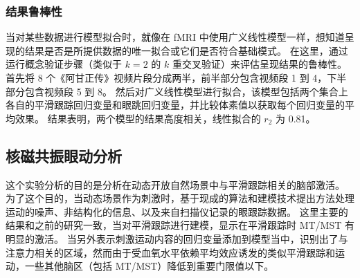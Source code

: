 



\subsubsection{结果鲁棒性} \label{sec:result_robustness}
当对某些数据进行模型拟合时，就像在 fMRI 中使用广义线性模型一样，想知道呈现的结果是否是所提供数据的唯一拟合或它们是否符合基础模式。
在这里，通过运行概念验证步骤（类似于 $k = 2$ 的 $k$ 重交叉验证）来评估呈现结果的鲁棒性。
首先将 8 个《阿甘正传》视频片段分成两半，前半部分包含视频段 1 到 4，下半部分包含视频段 5 到 8。
然后对广义线性模型进行拟合，该模型包括两个集合上各自的平滑跟踪回归变量和眼跳回归变量，并比较体素值以获取每个回归变量的平均效果。 
结果表明，两个模型的结果高度相关，线性拟合的 $r_2$ 为 0.81。




\subsection{核磁共振眼动分析}
这个实验分析的目的是分析在动态开放自然场景中与平滑跟踪相关的脑部激活。
为了这个目的，当动态场景作为刺激时，基于现成的算法和建模技术提出方法处理运动的噪声、非结构化的信息、以及来自扫描仪记录的眼跟踪数据。
这里主要的结果和之前的研究一致，当对平滑跟踪进行建模，显示在平滑跟踪时 MT/MST 有明显的激活。
当另外表示刺激运动内容的回归变量添加到模型当中，识别出了与注意力相关的区域，然而由于受血氧水平依赖平均效应诱发的类似平滑跟踪和运动，一些其他脑区（包括 MT/MST）降低到重要门限值以下。


